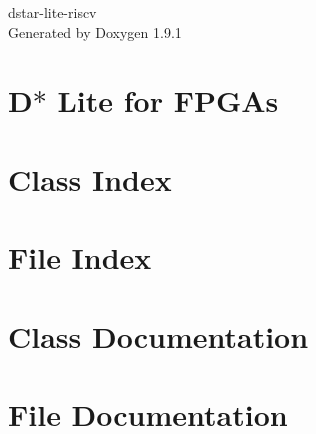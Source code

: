 \let\mypdfximage\pdfximage\def\pdfximage{\immediate\mypdfximage}\documentclass[twoside]{book}
\newcommand{\+}{\discretionary{\mbox{\scriptsize$\hookleftarrow$}}{}{}}
\newcommand{\clearemptydoublepage}{%
  \newpage{\pagestyle{empty}\cleardoublepage}%
}
\begin{document}
\raggedbottom

\hypersetup{pageanchor=false,
             bookmarksnumbered=true,
             pdfencoding=unicode
            }
\begin{titlepage}
\vspace*{7cm}
\begin{center}%
{\Large dstar-\/lite-\/riscv }\\
\vspace*{1cm}
{\large Generated by Doxygen 1.9.1}\\
\end{center}
\end{titlepage}
\clearemptydoublepage
{}
\tableofcontents
\clearemptydoublepage
{}
\hypersetup{pageanchor=true}

\chapter{D$\ast$ Lite for FPGAs}
\label{md_README}

\chapter{Class Index}

\chapter{File Index}

\chapter{Class Documentation}







\chapter{File Documentation}










\backmatter
\newpage
{}
\clearemptydoublepage
{}
\printindex
\end{document}
